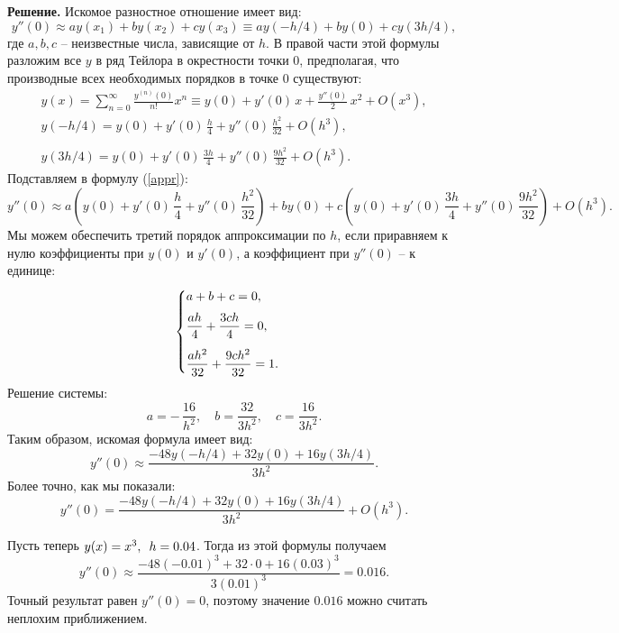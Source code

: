 \documentclass[12pt]{article}
\begin{document}
\noindent\textbf{Решение.} 
Искомое разностное отношение имеет вид:
\begin{equation}\label{appr}
    y''(0) \approx ay(x_1)+by(x_2)+cy(x_3) \equiv ay(-h/4) + by(0) + cy(3h/4),
\end{equation}
где $a,b,c$ -- неизвестные числа, зависящие от $h$. В правой части этой формулы разложим все $y$ в ряд Тейлора в окрестности точки 0, предполагая, что производные всех необходимых порядков в точке 0 существуют:
\begin{gather*}
    y(x) = \sum\limits_{n=0}^{\infty} \frac{y^{(n)}(0)}{n!} x^n \equiv y(0) + y'(0)\,x + \frac{y''(0)}{2}\,x^2 + O(x^3),\\
    y(-h/4) = y(0) + y'(0)\,\frac{h}{4} + y''(0)\,\frac{h^2}{32} + O(h^3),\\\\
    y(3h/4) = y(0) + y'(0)\,\frac{3h}{4} + y''(0)\,\frac{9h^2}{32} + O(h^3).
\end{gather*}
Подставляем в формулу (\ref{appr}):
\begin{equation*}
    y''(0) \approx a\left(y(0) + y'(0)\,\frac{h}{4} + y''(0)\,\frac{h^2}{32}\right) + by(0) + c\left(y(0) + y'(0)\,\frac{3h}{4} + y''(0)\,\frac{9h^2}{32}\right) + O(h^3).
\end{equation*}
Мы можем обеспечить третий порядок аппроксимации по $h$, если приравняем к нулю коэффициенты при $y(0)$ и $y'(0)$, а коэффициент при $y''(0)$ -- к единице:
\begin{equation*}
    \begin{cases}
    a + b + c = 0, \vspace{2mm}\\
    \displaystyle\frac{ah}{4} + \frac{3ch}{4} = 0, \vspace{3mm}\\
    \displaystyle\frac{ah^2}{32} + \frac{9ch^2}{32} = 1.
    \end{cases}
\end{equation*}
Решение системы:
\begin{equation*}
    a = -\,\frac{16}{h^2}, \quad b = \frac{32}{3h^2}, \quad c = \frac{16}{3h^2}.
\end{equation*}
\newpage
Таким образом, искомая формула имеет вид:
\begin{equation*}
    y''(0) \approx \frac{-48y(-h/4) + 32y(0) + 16y(3h/4)}{3h^2}.
\end{equation*}
Более точно, как мы показали:
\begin{equation*}
    y''(0) = \frac{-48y(-h/4) + 32y(0) + 16y(3h/4)}{3h^2} + O(h^3).
\end{equation*}

Пусть теперь $y(x) = x^3, \enskip h = 0.04$. Тогда из этой формулы получаем
\begin{equation*}
    y''(0) \approx \frac{-48(-0.01)^3 + 32\cdot 0 + 16(0.03)^3}{3(0.01)^3} = 0.016.
\end{equation*}
Точный результат равен $y''(0) = 0$, поэтому значение $0.016$ можно считать неплохим приближением.
\end{document}
